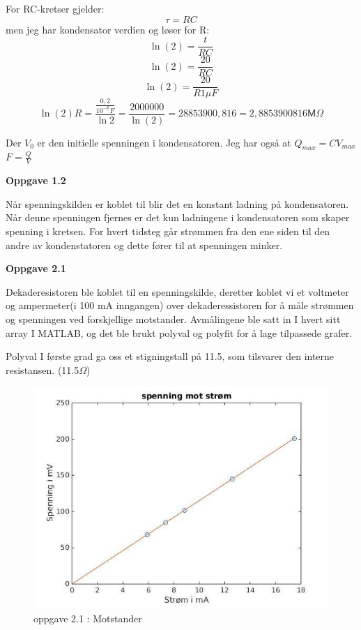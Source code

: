 \documentclass[12pt,a4paper,leqno]{report}
\begin{document}
For RC-kretser gjelder:
\begin{equation}
\tau=RC
\end{equation}
men jeg har kondensator verdien og løser for R:
\begin{equation}
\ln(2)=\frac{t}{RC}
\end{equation}
\begin{equation}
\ln(2)=\frac{20}{RC}
\end{equation}
\begin{equation}
\ln(2)=\frac{20}{R1 \mu F}
\end{equation}
\begin{equation}
\ln(2)R=\frac{\frac{0,2}{10^{-6} F}}{\ln{2}}=\frac{2000000}{\ln(2)}=28853900,816=2,8853900816\mathsf{M}\Omega
\end{equation}

Der $V_0$ er den initielle spenningen i kondensatoren.
Jeg har også at $Q_{max}=CV_{max}$
$F=\frac{Q}{V}$ 
\pagebreak

\textbf{Oppgave 1.2}

Når spenningskilden er koblet til blir det en konstant ladning på kondensatoren. Når denne spenningen fjernes er det kun ladningene i kondensatoren som skaper spenning i kretsen. For hvert tidsteg går strømmen fra den ene siden til den andre av kondenstatoren og dette fører til at spenningen minker.  

\textbf{Oppgave 2.1}

Dekaderesistoren ble koblet til en spenningskilde, deretter koblet vi et voltmeter og ampermeter(i 100 mA inngangen) over dekaderessistoren for å måle strømmen og spenningen ved forskjellige motstander. Avmålingene ble satt in I hvert sitt array I MATLAB, og det ble brukt polyval og polyfit for å lage tilpassede grafer.

Polyval I første grad ga oss et stigningstall på 11.5, som tilsvarer den interne resistansen. (11.5$\Omega$)

\begin{figure}[H]
\caption{oppgave 2.1 : Motstander}
\centering
\includegraphics[width=\textwidth]{gjennomforing/oppgave21/fransislab1oppgave21.jpg}
\end{figure}
\end{document}
